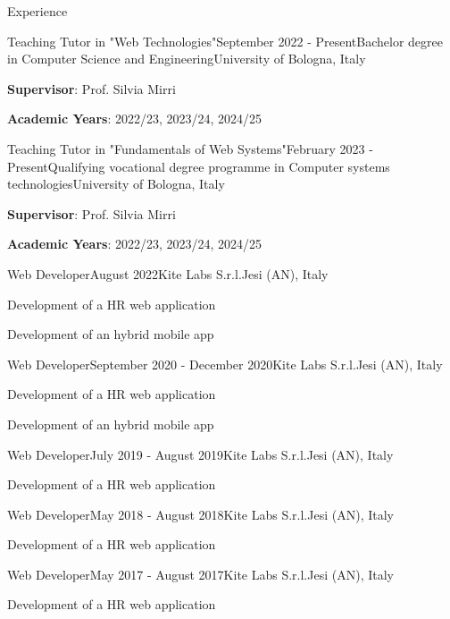 \documentclass[
	11pt, %
]{resume} %
\begin{document}
\begin{rSection}{Experience}

    \begin{rSubsection}{Teaching Tutor in "Web Technologies"}{September 2022 - Present}{Bachelor degree in Computer Science and Engineering}{University of Bologna, Italy}
        \item \textbf{Supervisor}: Prof. Silvia Mirri
        \item \textbf{Academic Years}: 2022/23, 2023/24, 2024/25
    \end{rSubsection}

    \begin{rSubsection}{Teaching Tutor in "Fundamentals of Web Systems"}{February 2023 - Present}{Qualifying vocational degree programme in Computer systems technologies}{University of Bologna, Italy}
        \item \textbf{Supervisor}: Prof. Silvia Mirri
        \item \textbf{Academic Years}: 2022/23, 2023/24, 2024/25
    \end{rSubsection}

    \begin{rSubsection}{Web Developer}{August 2022}{Kite Labs S.r.l.}{Jesi (AN), Italy}
	\item Development of a HR web application
        \item Development of an hybrid mobile app
    \end{rSubsection}

    \begin{rSubsection}{Web Developer}{September 2020 - December 2020}{Kite Labs S.r.l.}{Jesi (AN), Italy}
	\item Development of a HR web application
        \item Development of an hybrid mobile app
    \end{rSubsection}

    \begin{rSubsection}{Web Developer}{July 2019 - August 2019}{Kite Labs S.r.l.}{Jesi (AN), Italy}
	\item Development of a HR web application
    \end{rSubsection}

    \begin{rSubsection}{Web Developer}{May 2018 - August 2018}{Kite Labs S.r.l.}{Jesi (AN), Italy}
	\item Development of a HR web application
    \end{rSubsection}

    \begin{rSubsection}{Web Developer}{May 2017 - August 2017}{Kite Labs S.r.l.}{Jesi (AN), Italy}
	\item Development of a HR web application
    \end{rSubsection}
\end{rSection}
\end{document}

